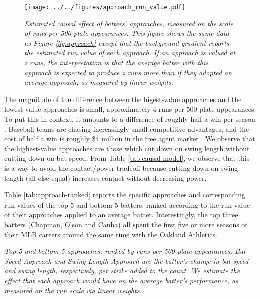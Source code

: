 \documentclass[
  12pt]{article}
\begin{document}
      \begin{figure}[H]
        \centering
        \texttt{[image: ../../figures/approach\_run\_value.pdf]}
        \caption{\it Estimated causal effect of batters' approaches, measured on the scale of runs per 500 plate appearances. This figure shows the same data as Figure \ref{fig:approach} except that the background gradient reports the estimated run value of each approach. If an approach is valued at z runs, the interpretation is that the average batter with this approach is expected to produce z runs more than if they adopted an average approach, as measured by linear weights.}
        \label{fig:approach-run-value}
      \end{figure}

      The magnitude of the difference between the higest-value approaches and the lowest-value approaches is small, approximately 4 runs per 500 plate appearances. To put this in context, it amounts to a difference of roughly half a win per season \citep{slowinski_converting_2010}. Baseball teams are chasing increasingly small competitive advantages, and the cost of half a win is roughly \$4 million in the free agent market \citep{clemens_what_2021}. We observe that the highest-value approaches are those which cut down on swing length without cutting down on bat speed. From Table \ref{tab:causal-model}, we observe that this is a way to avoid the contact/power tradeoff because cutting down on swing length (all else equal) increases contact without decreasing power.

      Table \ref{tab:approach-ranked} reports the specific approaches and corresponding run values of the top 5 and bottom 5 batters, ranked according to the run value of their approaches applied to an average batter. Interestingly, the top three batters (Chapman, Olson and Canha) all spent the first five or more seasons of their MLB careers around the same time with the Oakland Athletics.

      \begin{table}
        \centering
        
        \caption{\it Top 5 and bottom 5 approaches, ranked by runs per 500 plate appearances. Bat Speed Approach and Swing Length Approach are the batter's change in bat speed and swing length, respectively, per strike added to the count. We estimate the effect that each approach would have on the average batter's performance, as measured on the run scale via linear weights.}
        \label{tab:approach-ranked}
      \end{table}
\end{document}
